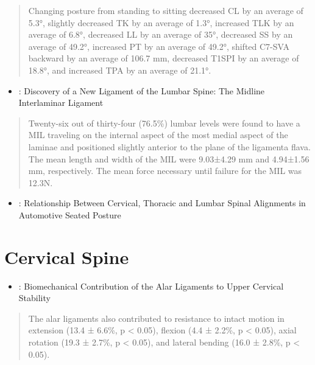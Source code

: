 \documentclass[]{book}
\providecommand{\tightlist}{%
  \setlength{\itemsep}{0pt}\setlength{\parskip}{0pt}}
\begin{document}
\begin{quote}
Changing posture from standing to sitting decreased CL by an average of 5.3°, slightly decreased TK by an average of 1.3°, increased TLK by an average of 6.8°, decreased LL by an average of 35°, decreased SS by an average of 49.2°, increased PT by an average of 49.2°, shifted C7-SVA backward by an average of 106.7 mm, decreased T1SPI by an average of 18.8°, and increased TPA by an average of 21.1°.
\end{quote}

\begin{itemize}
\tightlist
\item
  \citet{Simond2019}: Discovery of a New Ligament of the Lumbar Spine: The Midline Interlaminar Ligament
\end{itemize}

\begin{quote}
Twenty-six out of thirty-four (76.5\%) lumbar levels were found to have a MIL traveling on the internal aspect of the most medial aspect of the laminae and positioned slightly anterior to the plane of the ligamenta flava.
The mean length and width of the MIL were 9.03±4.29 mm and 4.94±1.56 mm, respectively. The mean force necessary until failure for the MIL was 12.3N.
\end{quote}

\begin{itemize}
\tightlist
\item
  \citet{Sato2019}: Relationship Between Cervical, Thoracic and Lumbar Spinal Alignments in Automotive Seated Posture
\end{itemize}

\hypertarget{cervical-spine}{%
\section{Cervical Spine}\label{cervical-spine}}

\begin{itemize}
\tightlist
\item
  \citet{Tisherman2019}: Biomechanical Contribution of the Alar Ligaments to Upper Cervical Stability
\end{itemize}

\begin{quote}
The alar ligaments also contributed to resistance to intact motion in extension (13.4 ± 6.6\%, p \textless{} 0.05), flexion (4.4 ± 2.2\%, p \textless{} 0.05), axial rotation (19.3 ± 2.7\%, p \textless{} 0.05), and lateral bending (16.0 ± 2.8\%, p \textless{} 0.05).
\end{quote}
\end{document}
